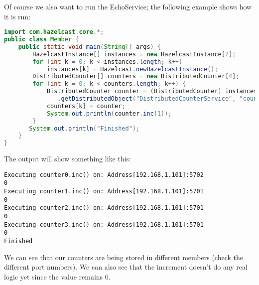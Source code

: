 Of course we also want to run the EchoService; the following example shows how it is run:
\begin{lstlisting}[language=java]
import com.hazelcast.core.*;
public class Member {
    public static void main(String[] args) {
        HazelcastInstance[] instances = new HazelcastInstance[2];
        for (int k = 0; k < instances.length; k++) 
            instances[k] = Hazelcast.newHazelcastInstance();
        DistributedCounter[] counters = new DistributedCounter[4];
        for (int k = 0; k < counters.length; k++) {
            DistributedCounter counter = (DistributedCounter) instances[0]
               .getDistributedObject("DistributedCounterService", "counter" + k);
            counters[k] = counter;
            System.out.println(counter.inc(1));
        }
       System.out.println("Finished");
    }
}
\end{lstlisting}

The output will show something like this:
\begin{lstlisting}
Executing counter0.inc() on: Address[192.168.1.101]:5702
0
Executing counter1.inc() on: Address[192.168.1.101]:5701
0
Executing counter2.inc() on: Address[192.168.1.101]:5701
0
Executing counter3.inc() on: Address[192.168.1.101]:5701
0
Finished
\end{lstlisting}
We can see that our counters are being stored in different members (check the different port numbers). We can also see that the increment doesn't do any real logic yet since the value remains 0.


